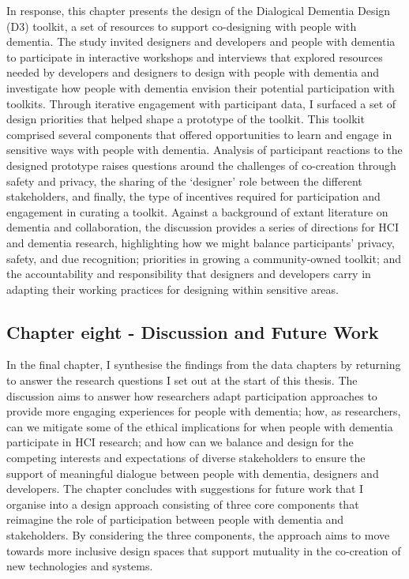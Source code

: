 In response, this chapter presents the design of the Dialogical Dementia Design (D3) toolkit, a set of resources to support co-designing with people with dementia. The study invited designers and developers and people with dementia to participate in interactive workshops and interviews that explored resources needed by developers and designers to design with people with dementia and investigate how people with dementia envision their potential participation with toolkits. Through iterative engagement with participant data, I surfaced a set of design priorities that helped shape a prototype of the toolkit. This toolkit comprised several components that offered opportunities to learn and engage in sensitive ways with people with dementia. Analysis of participant reactions to the designed prototype raises questions around the challenges of co-creation through safety and privacy, the sharing of the ‘designer’ role between the different stakeholders, and finally, the type of incentives required for participation and engagement in curating a toolkit. Against a background of extant literature on dementia and collaboration, the discussion provides a series of directions for HCI and dementia research, highlighting how we might balance participants' privacy, safety, and due recognition; priorities in growing a community-owned toolkit; and the accountability and responsibility that designers and developers carry in adapting their working practices for designing within sensitive areas.
\subsection{Chapter eight - Discussion and Future Work}
\label{Intro:ChapterEight}
In the final chapter, I synthesise the findings from the data chapters by returning to answer the research questions I set out at the start of this thesis. The discussion aims to answer how researchers adapt participation approaches to provide more engaging experiences for people with dementia; how, as researchers, can we mitigate some of the ethical implications for when people with dementia participate in HCI research; and how can we balance and design for the competing interests and expectations of diverse stakeholders to ensure the support of meaningful dialogue between people with dementia, designers and developers. The chapter concludes with suggestions for future work that I organise into a design approach consisting of three core components that reimagine the role of participation between people with dementia and stakeholders. By considering the three components, the approach aims to move towards more inclusive design spaces that support mutuality in the co-creation of new technologies and systems.

